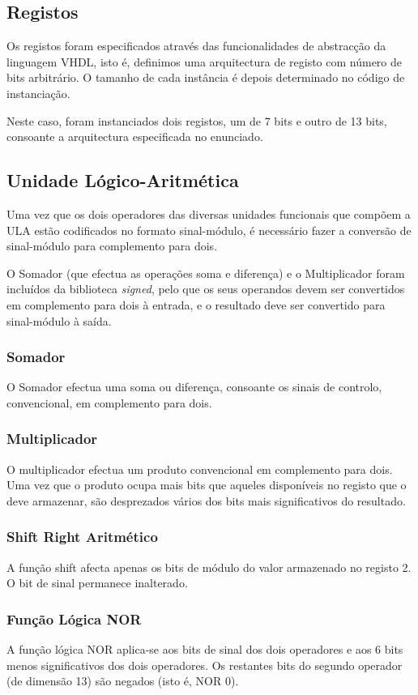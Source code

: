 \documentclass[a4paper]{article}
\begin{document}
\subsection{Registos}
Os registos foram especificados através das funcionalidades de abstracção da linguagem VHDL, isto é, definimos uma arquitectura de registo com número de bits arbitrário. O tamanho de cada instância é depois determinado no código de instanciação.

Neste caso, foram instanciados dois registos, um de 7 bits e outro de 13 bits, consoante a arquitectura especificada no enunciado.


\subsection{Unidade Lógico-Aritmética}
Uma vez que os dois operadores das diversas unidades funcionais que compõem a ULA estão codificados no formato sinal-módulo, é necessário fazer a conversão de sinal-módulo para complemento para dois.

O Somador (que efectua as operações soma e diferença) e o Multiplicador foram incluídos da biblioteca \emph{signed}, pelo que os seus operandos devem ser convertidos em complemento para dois à entrada, e o resultado deve ser convertido para sinal-módulo à saída.


\subsubsection{Somador}
O Somador efectua uma soma ou diferença, consoante os sinais de controlo, convencional, em complemento para dois.

\subsubsection{Multiplicador}
O multiplicador efectua um produto convencional em complemento para dois. Uma vez que o produto ocupa mais bits que aqueles disponíveis no registo que o deve armazenar, são desprezados vários dos bits mais significativos do resultado.

\subsubsection{Shift Right Aritmético}
A função shift afecta apenas os bits de módulo do valor armazenado no registo 2. O bit de sinal permanece inalterado.

\subsubsection{Função Lógica NOR}
A função lógica NOR aplica-se aos bits de sinal dos dois operadores e aos 6 bits menos significativos dos dois operadores. Os restantes bits do segundo operador (de dimensão 13) são negados (isto é, NOR 0).
\end{document}

